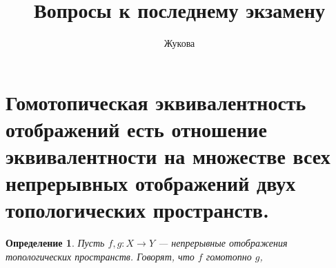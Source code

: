 \documentclass[a4paper]{article}
\author{Жукова}
\title{Вопросы к последнему экзамену}
\date{}
\newtheorem{defin}{Определение}
\begin{document}
\maketitle
\section{Гомотопическая эквивалентность отображений есть отношение
эквивалентности на множестве всех непрерывных отображений двух
топологических пространств.}
\begin{defin}
Пусть $f,g\colon X\to Y$ --- непрерывные отображения топологических
пространств. Говорят, что $f$ гомотопно  $g$, 
\end{defin}
\end{document}
